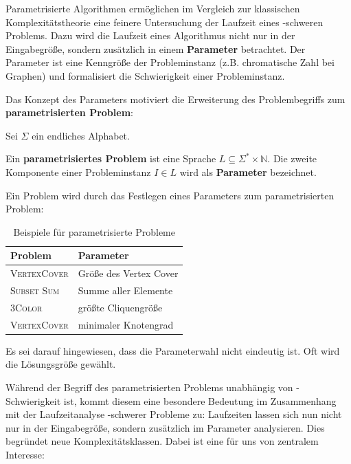 \documentclass[a4paper,ngerman]{atseminar}
\newcommand{\N}{\ensuremath{\mathbb{N}}\xspace}
\begin{document}
Parametrisierte Algorithmen ermöglichen im Vergleich zur klassischen Komplexitätstheorie eine feinere Untersuchung der Laufzeit eines \NP-schweren Problems.
Dazu wird die Laufzeit eines Algorithmus nicht nur in der Eingabegröße, sondern zusätzlich in einem \textbf{Parameter} betrachtet.
Der Parameter ist eine Kenngröße der Probleminstanz (z.B. chromatische Zahl bei Graphen) und formalisiert die Schwierigkeit einer Probleminstanz.

\noindent
Das Konzept des Parameters motiviert die Erweiterung des Problembegriffs zum \textbf{parametrisierten Problem}:

\begin{definition}
  Sei $\Sigma$ ein endliches Alphabet.

  \noindent
  Ein \textbf{parametrisiertes Problem} ist eine Sprache $L \subseteq \Sigma^* \times \N$.
  \noindent
  Die zweite Komponente einer Probleminstanz $I \in L$ wird als \textbf{Parameter} bezeichnet.
\end{definition}

\noindent
Ein Problem wird durch das Festlegen eines Parameters zum parametrisierten Problem:

\begin{table}[H]
  \centering
  \caption{Beispiele für parametrisierte Probleme}
  \begin{tabular}{ll}
    \toprule
    \textbf{Problem} & \textbf{Parameter} \\
    \midrule
    \textsc{VertexCover} & Größe des Vertex Cover \\
    \midrule
    \textsc{Subset Sum} & Summe aller Elemente \\
    \midrule
    \textsc{3Color} & größte Cliquengröße \\
    \midrule
    \textsc{VertexCover} &  minimaler Knotengrad \\
    \bottomrule
    
  \end{tabular}
  \end{table}

\noindent
Es sei darauf hingewiesen, dass die Parameterwahl nicht eindeutig ist. Oft wird die Lösungsgröße gewählt.

\noindent
Während der Begriff des parametrisierten Problems unabhängig von \NP-Schwierigkeit ist, kommt diesem eine besondere
Bedeutung im Zusammenhang mit der Laufzeitanalyse \NP-schwerer Probleme zu: Laufzeiten lassen sich nun nicht nur in der Eingabegröße, sondern zusätzlich
im Parameter analysieren.
Dies begründet neue Komplexitätsklassen. Dabei ist eine für uns von zentralem Interesse:
\end{document}
